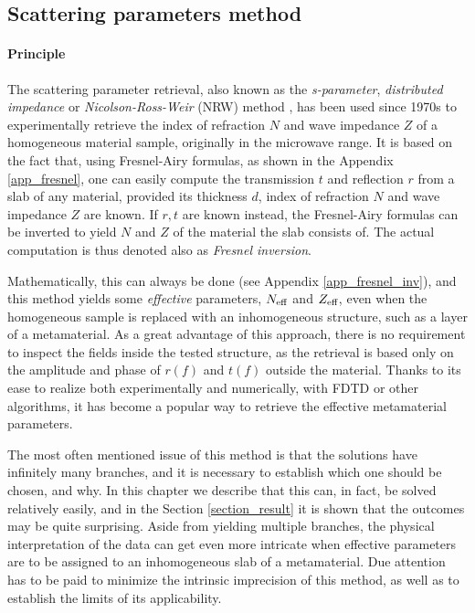 \subsection{Scattering parameters method}
\paragraph{Principle} %
The scattering parameter retrieval, also known as the \textit{s-parameter}, \textit{distributed impedance} or \textit{Nicolson-Ross-Weir} (NRW) method \cite{nicolson1970measurement, weir1974automatic}, has been used since 1970s to experimentally retrieve the index of refraction $N$ and wave impedance $Z$ of a homogeneous material sample, originally in the microwave range. It is based on the fact that, using Fresnel-Airy formulas, as shown in the Appendix \ref{app_fresnel},
one can easily compute the transmission $t$ and reflection $r$ from a slab of any material, provided its thickness $d$, index of refraction $N$ and wave impedance $Z$ are known.  If $r,t$ are known instead, the Fresnel-Airy formulas can be inverted to yield $N$ and $Z$ of the material the slab consists of. The actual computation is thus denoted also as \textit{Fresnel inversion}.

Mathematically, this can always be done (see Appendix \ref{app_fresnel_inv}), and this method yields some \textit{effective} parameters, $N_{\text{eff} }$ and $Z_{\text{eff} }$, even when the homogeneous sample is replaced with an inhomogeneous structure, such as a layer of a metamaterial. As a great advantage of this approach, there is no requirement to inspect the fields inside the tested structure, as the retrieval is based only on the amplitude and phase of $r(f)$ and $t(f)$ outside the material. Thanks to its ease to realize both experimentally and numerically, with FDTD or other algorithms, %
it has become a popular way to retrieve the effective metamaterial parameters. 

The most often mentioned issue of this method is that the solutions have infinitely many branches, and it is necessary to establish which one should be chosen, and why. In this chapter we describe that this can, in fact, be solved relatively easily, and in the Section \ref{section_result} it is shown that the outcomes may be quite surprising.
Aside from yielding multiple branches, the physical interpretation of the data can get even more intricate when effective parameters are to be assigned to an inhomogeneous slab of a metamaterial. Due attention has to be paid to minimize the intrinsic imprecision of this method, as well as to establish the limits of its applicability. 
